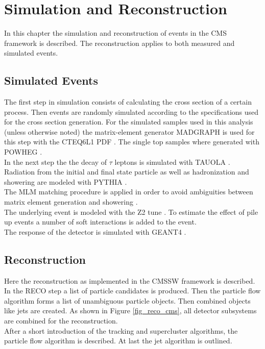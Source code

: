 \chapter{Simulation and Reconstruction}

In this chapter the simulation and reconstruction of events in the CMS framework is described. The reconstruction applies to both measured and simulated events.

\section{Simulated Events}

The first step in simulation consists of calculating the cross section of a certain process. Then events are randomly simulated according to the specifications used for the cross section generation. For the simulated samples used in this analysis (unless otherwise noted) the matrix-element generator MADGRAPH is used for this step \cite{Alwall:2014hca} with the CTEQ6L1 PDF \cite{Pumplin:2002vw}. The single top samples where generated with POWHEG \cite{Nason:2004rx} \cite{Frixione:2007vw} \cite{Alioli:2010xd} \cite{Re:2010bp} \cite{Alioli:2009je}. \\
In the next step the the decay of $\tau$ leptons is simulated with TAUOLA \cite{Davidson:2010rw}. \\
Radiation from the initial and final state particle  as well as hadronization and showering are modeled with PYTHIA \cite{Sjostrand:2006za}. \\
The MLM matching procedure is applied in order to avoid ambiguities between matrix element generation and showering \cite{Mangano:2006rw}.\\
The underlying event is modeled with the Z2 tune \cite{Field:2012jv}. To estimate the effect of pile up events a number of soft interactions is added to the event. \\
The response of the detector is simulated with GEANT4 \cite{Agostinelli:2002hh}.

\section{Reconstruction}

Here the reconstruction as implemented in the CMSSW framework is described. \\
In the RECO step a list of particle candidates is produced. Then the particle flow algorithm forms a list of unambiguous particle objects. Then combined objects like jets are created. As shown in Figure \ref{fig_reco_cms}, all detector subsystems are combined for the reconstruction. \\
After a short introduction of the tracking and supercluster algorithms, the particle flow algorithm is described. At last the jet algorithm is outlined.\\

